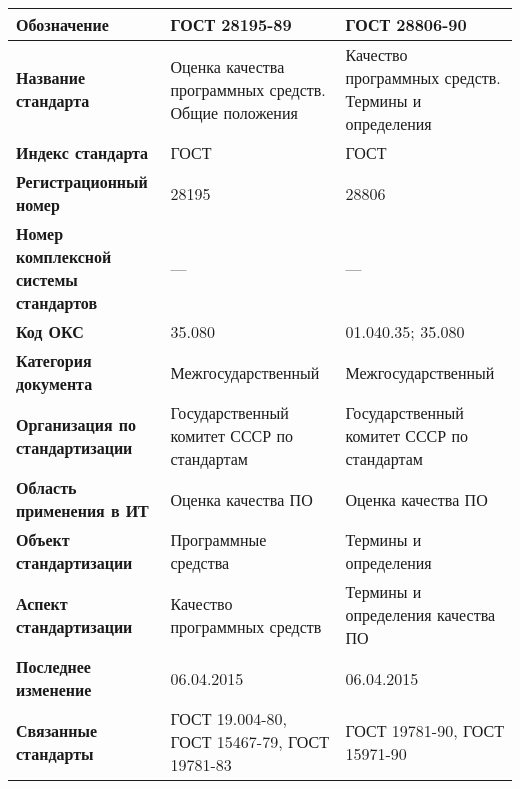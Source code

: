 \begin{table}[h!tp]
	\centering
	\caption{}
	\label{table:interstate}
	\begin{tabular}{|p{10em}|p{12em}|p{12em}|}
		\hline
		\textbf{Обозначение}
			& \textbf{ГОСТ 28195-89} & \textbf{ГОСТ 28806-90} \\ \hline
		\textbf{Название стандарта}
			& Оценка качества программных средств. Общие положения
			& Качество программных средств. Термины и определения \\ \hline
		\textbf{Индекс стандарта} & ГОСТ & ГОСТ \\ \hline
		\textbf{Регистрационный номер} & 28195 & 28806 \\ \hline
		\textbf{Номер комплексной системы стандартов} & --- & --- \\ \hline
		\textbf{Код ОКС} & 35.080 & 01.040.35; 35.080 \\ \hline
		\textbf{Категория документа}
			& Межгосударственный & Межгосударственный \\ \hline
		\textbf{Организация по стандартизации}
			& Государственный комитет СССР по стандартам
			& Государственный комитет СССР по стандартам \\ \hline
		\textbf{Область применения в ИТ}
			& Оценка качества ПО & Оценка качества ПО \\ \hline
		\textbf{Объект стандартизации}
			& Программные средства & Термины и определения \\ \hline
		\textbf{Аспект стандартизации}
			& Качество программных средств
			& Термины и определения качества ПО \\ \hline
		\textbf{Последнее изменение} & 06.04.2015 & 06.04.2015 \\ \hline
		\textbf{Связанные стандарты}
			& ГОСТ 19.004-80, ГОСТ 15467-79, ГОСТ 19781-83
			& ГОСТ 19781-90, ГОСТ 15971-90 \\ \hline
	\end{tabular}
\end{table}

